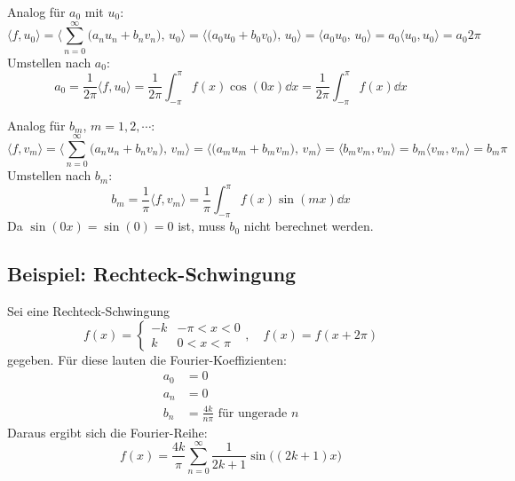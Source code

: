 			Analog für \( a_0 \) mit \( u_0 \):
			\begin{equation*}
				\langle f, u_0 \rangle
				= \Bigg\langle \sum_{n = 0}^{\infty} \big( a_n u_n + b_n v_n \big),\, u_0 \Bigg\rangle
				= \Big\langle \big( a_0 u_0 + b_0 v_0 \big),\, u_0 \Big\rangle
				= \langle a_0 u_0,\, u_0 \rangle
				= a_0 \langle u_0, u_0 \rangle
				= a_0 2\pi
			\end{equation*}
			Umstellen nach \( a_0 \):
			\begin{equation*}
				a_0 = \frac{1}{2\pi} \langle f, u_0 \rangle = \frac{1}{2\pi} \int_{-\pi}^{\pi} \! f(x) \cos(0x) \dd{x} = \frac{1}{2\pi} \int_{-\pi}^{\pi} f(x) \dd{x}
			\end{equation*}

			Analog für \( b_m \), \( m = 1, 2, \cdots \):
			\begin{equation*}
				\langle f, v_m \rangle
				= \Bigg\langle \sum_{n = 0}^{\infty} \big( a_n u_n + b_n v_n \big),\, v_m \Bigg\rangle
				= \Big\langle \big( a_m u_m + b_m v_m \big),\, v_m \Big\rangle
				= \langle b_m v_m, v_m \rangle
				= b_m \langle v_m, v_m \rangle
				= b_m \pi
			\end{equation*}
			Umstellen nach \( b_m \):
			\begin{equation*}
				b_m = \frac{1}{\pi} \langle f, v_m \rangle = \frac{1}{\pi} \int_{-\pi}^{\pi} \! f(x) \sin(mx) \dd{x}
			\end{equation*}
			Da \( \sin(0x) = \sin(0) = 0 \) ist, muss \( b_0 \) nicht berechnet werden.

		\subsection{Beispiel: Rechteck-Schwingung}
			Sei eine Rechteck-Schwingung
			\begin{equation*}
				f(x) =
				\begin{cases}
					-k & -\pi < x < 0 \\
					k  & 0 < x < \pi
				\end{cases},\quad f(x) = f(x + 2\pi)
			\end{equation*}
			gegeben. Für diese lauten die Fourier-Koeffizienten:
			\begin{align*}
				a_0 & = 0                                       \\
				a_n & = 0                                       \\
				b_n & = \frac{4k}{n\pi} \text{ für ungerade } n
			\end{align*}
			Daraus ergibt sich die Fourier-Reihe:
			\begin{equation*}
				f(x) = \frac{4k}{\pi} \sum_{n = 0}^{\infty} \frac{1}{2k + 1} \sin\big((2k + 1) x\big)
			\end{equation*}

